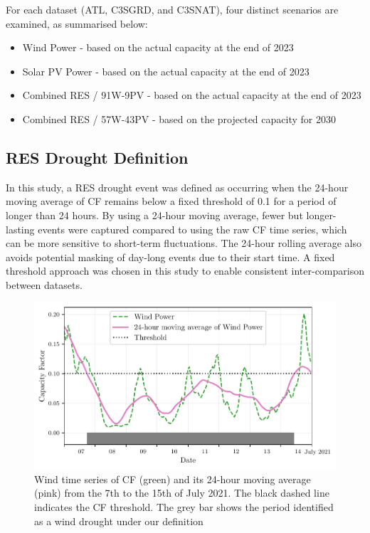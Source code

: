 \documentclass[preprint, 12pt]{elsarticle}
\providecommand{\DIFadd}[1]{{\protect\color{blue}\uwave{#1}}} %
\providecommand{\DIFaddbegin}{} %
\providecommand{\DIFaddend}{} %
\begin{document}
For each dataset (ATL, C3S\DIFaddbegin \DIFadd{~}\DIFaddend GRD, and C3S\DIFaddbegin \DIFadd{~}\DIFaddend NAT), four distinct scenarios are examined, as summarised below:

\begin{itemize}
	\item Wind Power - based on the actual capacity at the end of 2023
	\item Solar PV Power - based on the actual capacity at the end of 2023
	\item Combined RES / 91W-9PV - based on the actual capacity at the end of 2023
	\item Combined RES / 57W-43PV - based on the projected capacity for 2030
\end{itemize}

\subsection{RES Drought Definition}
\label{sec:res_drought}

In this study, a RES drought event was defined as occurring when the 24-hour moving average of CF remains below a fixed threshold of 0.1 for a period of longer than 24 hours. By using a 24-hour moving average, fewer but longer-lasting events were captured compared to using the raw CF time series, which can be more sensitive to short-term fluctuations. The 24-hour rolling average also avoids potential masking of day-long events due to their start time. A fixed threshold approach was chosen in this study to enable consistent inter-comparison between datasets.

\begin{figure}[ht!]
	\centering
	\includegraphics[width=\textwidth]{droughts_methodology.pdf}
	\caption{Wind time series of CF (green) and its 24-hour moving average (pink) from the 7th to the 15th of July 2021. The black dashed line indicates the CF threshold. The grey bar shows the period identified as a wind drought under our definition}
	\label{fig:find_res_droughts}
\end{figure}
\end{document}
